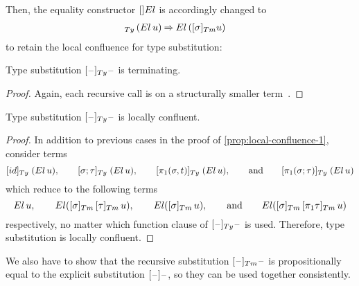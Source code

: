 \documentclass[a4paper,UKenglish,numberwithinsect,cleveref,thm-restate]{lipics-v2021}
\newcommand{\danger}{\marginpar[\hfill\dbend]{\dbend\hfill}}
\begin{document}
Then, the equality constructor $[]\El$ is accordingly changed to 
\begin{align}
  [ \sigma ]_{\Ty}\,(\El\, u) & \reduce \El\,([\sigma]_{\Tm} {u}) \label{eq:def-type-subst-7}
\end{align}
to retain the local confluence for type substitution:
\begin{proposition}[Termination]
  Type substitution $[\blank]_{\Ty}\blank$ is terminating.
  \danger
\end{proposition}
\begin{proof}
  Again, each recursive call is on a structurally smaller term~\cite{Abel2002}.
\end{proof}
\begin{proposition} \label{prop:local-confluence-2}
  Type substitution $[\blank]_{\Ty}\blank$ is locally confluent.
  \danger
\end{proposition}
\begin{proof}
  In addition to previous cases in the proof of \cref{prop:local-confluence-1}, consider terms 
  \[
    [\idS]_{\Ty}\;(\El\,u), \qquad [\sigma;\tau]_{\Ty}\;(\El\,u), \qquad [\pi_1(\sigma, t)]_{\Ty}\;(\El\,u), \qquad\text{and}\qquad [\pi_1(\sigma; \tau)]_{\Ty}\;(\El\,u)
  \]
  which reduce to the following terms
  \[
    \El\,u, \qquad \El([\sigma]_{\Tm}\,[\tau]_{\Tm}\,u), \qquad \El([\sigma]_{\Tm}\,u), \qquad\text{and}\qquad
    \El([\sigma]_{\Tm}\,[\pi_1\tau]_{\Tm}\,u)
  \]
  respectively, no matter which function clause of $[\blank]_{\Ty}\blank$ is used.
  Therefore, type substitution is locally confluent.
\end{proof}

We also have to show that the recursive substitution $[\blank]_{\Tm}\blank$ is propositionally equal to the explicit substitution $[\mathord{\hspace{1pt}\text{--}\hspace{1pt}}]\mathord{\hspace{1pt}\text{--}\hspace{1pt}}$, so they can be used together consistently.
\end{document}
